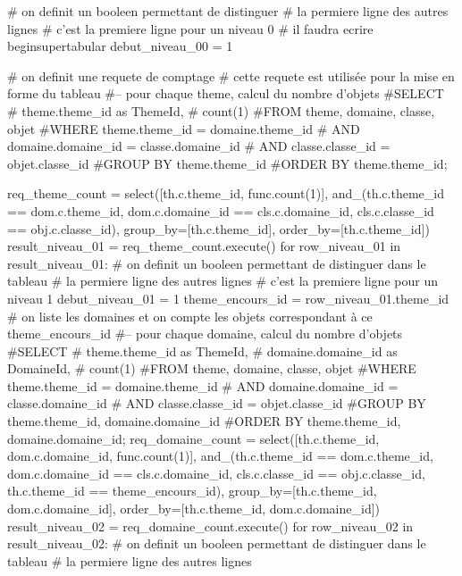 \documentclass[12pt,titlepage]{book}
\begin{document}
\begin{lbdpython}

# on definit un booleen permettant de distinguer
# la permiere ligne des autres lignes
# c'est la premiere ligne pour un niveau 0
# il faudra ecrire begin{supertabular}
debut_niveau_00 = 1


# on definit une requete de comptage
# cette requete est utilisée pour la mise en forme du tableau
#-- pour chaque theme, calcul du nombre d'objets
#SELECT
#   theme.theme_id as ThemeId,
#   count(1)
#FROM theme, domaine, classe, objet
#WHERE theme.theme_id = domaine.theme_id 
#  AND domaine.domaine_id = classe.domaine_id
#  AND classe.classe_id = objet.classe_id
#GROUP BY theme.theme_id
#ORDER BY theme.theme_id;

req_theme_count = select([th.c.theme_id, func.count(1)],
                  and_(th.c.theme_id == dom.c.theme_id,
                       dom.c.domaine_id == cls.c.domaine_id,
                       cls.c.classe_id == obj.c.classe_id),
                  group_by=[th.c.theme_id],
                  order_by=[th.c.theme_id])
result_niveau_01 = req_theme_count.execute()
for row_niveau_01 in result_niveau_01:
   # on definit un booleen permettant de distinguer dans le tableau
   # la permiere ligne des autres lignes
   # c'est la premiere ligne pour un niveau 1
   debut_niveau_01 = 1
   theme_encours_id = row_niveau_01.theme_id
   # on liste les domaines et on compte les objets correspondant à ce theme_encours_id
   #-- pour chaque domaine, calcul du nombre d'objets
   #SELECT
   #   theme.theme_id as ThemeId,
   #   domaine.domaine_id as DomaineId,
   #   count(1)
   #FROM theme, domaine, classe, objet
   #WHERE theme.theme_id = domaine.theme_id
   #  AND domaine.domaine_id = classe.domaine_id
   #  AND classe.classe_id = objet.classe_id
   #GROUP BY theme.theme_id, domaine.domaine_id
   #ORDER BY theme.theme_id, domaine.domaine_id;
   req_domaine_count = select([th.c.theme_id, dom.c.domaine_id, func.count(1)],
                       and_(th.c.theme_id == dom.c.theme_id,
                            dom.c.domaine_id == cls.c.domaine_id,
                            cls.c.classe_id == obj.c.classe_id,
                            th.c.theme_id == theme_encours_id),
                       group_by=[th.c.theme_id, dom.c.domaine_id],
                       order_by=[th.c.theme_id, dom.c.domaine_id])
   result_niveau_02 = req_domaine_count.execute()
   for row_niveau_02 in result_niveau_02:
      # on definit un booleen permettant de distinguer dans le tableau
      # la permiere ligne des autres lignes

\end{lbdpython}
\end{document}
